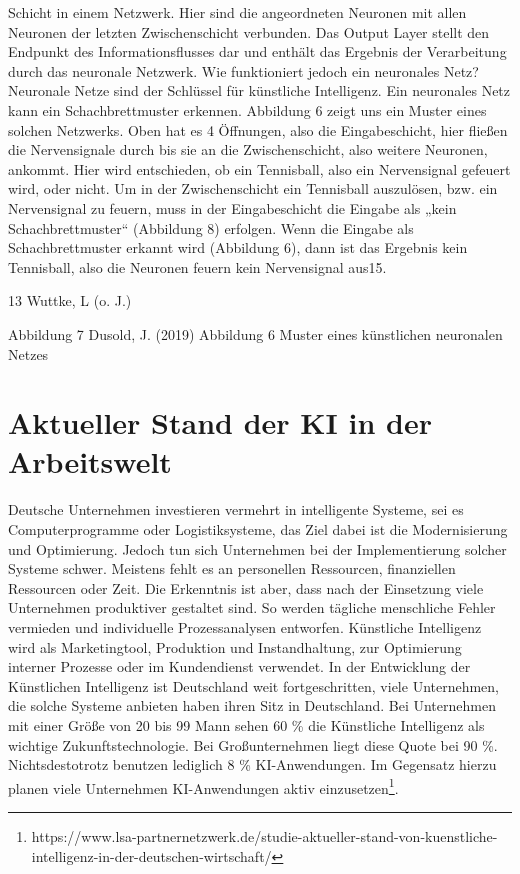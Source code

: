 Schicht in einem Netzwerk. Hier sind die angeordneten Neuronen mit allen Neuronen der letzten Zwischenschicht verbunden. Das Output Layer stellt den Endpunkt des 
Informationsflusses dar und enthält das Ergebnis der Verarbeitung durch das neuronale Netzwerk. Wie funktioniert jedoch ein neuronales Netz? Neuronale Netze sind 
der Schlüssel für künstliche Intelligenz. Ein neuronales Netz kann ein Schachbrettmuster erkennen. Abbildung 6 zeigt uns ein Muster eines solchen Netzwerks. 
Oben hat es 4 Öffnungen, also die Eingabeschicht, hier fließen die Nervensignale durch bis sie an die Zwischenschicht, also weitere Neuronen, ankommt. Hier wird 
entschieden, ob ein Tennisball, also ein Nervensignal gefeuert wird, oder nicht. Um in der Zwischenschicht ein Tennisball auszulösen, bzw. ein Nervensignal
zu feuern, muss in der Eingabeschicht die Eingabe als „kein Schachbrettmuster“ (Abbildung 8) erfolgen. Wenn die Eingabe als Schachbrettmuster erkannt wird 
(Abbildung 6), dann ist das Ergebnis kein Tennisball, also die Neuronen feuern kein Nervensignal aus15.
 

13 Wuttke, L (o. J.)


Abbildung 7
Dusold, J. (2019)
Abbildung 6 Muster eines künstlichen neuronalen Netzes


\section{Aktueller Stand der KI in der Arbeitswelt}

Deutsche Unternehmen investieren vermehrt in intelligente Systeme, sei es Computerprogramme oder Logistiksysteme, das Ziel dabei ist die Modernisierung und 
Optimierung. Jedoch tun sich Unternehmen bei der Implementierung solcher Systeme schwer. Meistens fehlt es an personellen Ressourcen, finanziellen Ressourcen 
oder Zeit. Die Erkenntnis ist aber, dass nach der Einsetzung viele Unternehmen produktiver gestaltet sind. So werden tägliche menschliche Fehler vermieden und 
individuelle Prozessanalysen entworfen. Künstliche Intelligenz wird als Marketingtool, Produktion und Instandhaltung, zur Optimierung interner Prozesse oder
im Kundendienst verwendet. In der Entwicklung der Künstlichen Intelligenz ist Deutschland weit fortgeschritten, viele Unternehmen, die solche Systeme anbieten 
haben ihren Sitz in Deutschland. Bei Unternehmen mit einer Größe von 20 bis 99 Mann sehen 60 \% die Künstliche Intelligenz als wichtige Zukunftstechnologie. 
Bei Großunternehmen liegt diese Quote bei 90 \%. Nichtsdestotrotz benutzen lediglich 8 \% KI-Anwendungen. Im Gegensatz hierzu planen viele Unternehmen KI-Anwendungen
aktiv einzusetzen\footnote{https://www.lsa-partnernetzwerk.de/studie-aktueller-stand-von-kuenstliche-intelligenz-in-der-deutschen-wirtschaft/}.\cite{wagener2019künstliche}
\newline

